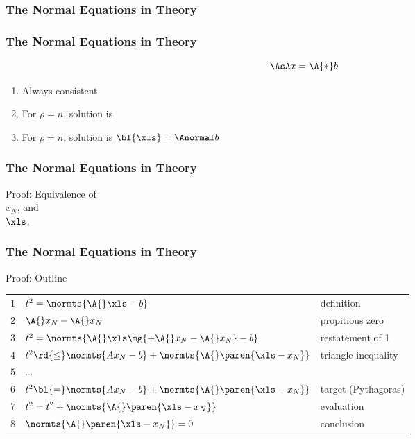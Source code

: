\subsubsection{The Normal Equations in Theory}
\begin{frame}\frametitle{The Normal Equations in Theory}
	$$\AsA x =  \A{*}b$$
\begin{enumerate}
	\item Always consistent
	\item For $\rho = n$, solution is 
	\item For $\rho = n$, solution is $\bl{\xls} = \Anormal b$
\end{enumerate}
\end{frame}
%
\begin{frame}\frametitle{The Normal Equations in Theory}
Proof: Equivalence of \\ 
	$x_{N}$,  and \\
	$\xls$, 
\end{frame}
%
\begin{frame}\frametitle{The Normal Equations in Theory}
Proof: Outline
\begin{table}[htp]
\begin{center}
\begin{tabular}{lll}
	$1$ & $t^{2}= \normts{\A{}\xls - b}$ & definition \\[5pt]
	\pause
	$2$ & $\A{}x_{N} - \A{}x_{N}$ & propitious zero \\[5pt]
	\pause
	$3$ & $t^{2}= \normts{\A{}\xls \mg{+ \A{}x_{N} - \A{}x_{N}} - b}$ & restatement of 1 \\[5pt]
	\pause
	$4$ & $t^{2} \rd{\le} \normts{A{}x_{N} - b} + \normts{\A{}\paren{\xls -x_{N}}}$ & triangle inequality \\[5pt]
	\pause
	$5$ & $...$ & \bl{Miracle}\\[5pt]
	\pause
	$6$ & $t^{2} \bl{=} \normts{A{}x_{N} - b} + \normts{\A{}\paren{\xls -x_{N}}}$ & target (Pythagoras)\\[5pt]
	\pause
	$7$ & $t^{2} = t^{2} + \normts{\A{}\paren{\xls -x_{N}}}$ & evaluation\\[5pt]
	\pause
	$8$ & $\normts{\A{}\paren{\xls -x_{N}}} = 0$ & conclusion\\
\end{tabular}
\end{center}
\end{table}%
\end{frame}

